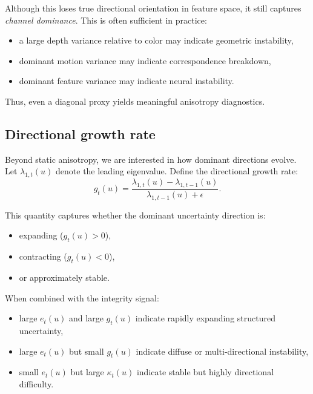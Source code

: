 \documentclass[11pt,letterpaper]{article}
\theoremstyle{gcresult}
\theoremstyle{definition}
\begin{document}
Although this loses true directional orientation in feature space, it still captures \emph{channel dominance}. This is often sufficient in practice:
\begin{itemize}[leftmargin=1.5em]
    \item a large depth variance relative to color may indicate geometric instability,
    \item dominant motion variance may indicate correspondence breakdown,
    \item dominant feature variance may indicate neural instability.
\end{itemize}

Thus, even a diagonal proxy yields meaningful anisotropy diagnostics.


\subsection{Directional growth rate}

Beyond static anisotropy, we are interested in how dominant directions evolve. Let $\lambda_{1,t}(u)$ denote the leading eigenvalue. Define the directional growth rate:
\begin{equation}
g_t(u)=\frac{\lambda_{1,t}(u)-\lambda_{1,t-1}(u)}{\lambda_{1,t-1}(u)+\epsilon}.
\end{equation}

This quantity captures whether the dominant uncertainty direction is:
\begin{itemize}[leftmargin=1.5em]
    \item expanding ($g_t(u)>0$),
    \item contracting ($g_t(u)<0$),
    \item or approximately stable.
\end{itemize}

When combined with the integrity signal:
\begin{itemize}[leftmargin=1.5em]
    \item large $e_t(u)$ and large $g_t(u)$ indicate rapidly expanding structured uncertainty,
    \item large $e_t(u)$ but small $g_t(u)$ indicate diffuse or multi-directional instability,
    \item small $e_t(u)$ but large $\kappa_t(u)$ indicate stable but highly directional difficulty.
\end{itemize}
\end{document}
